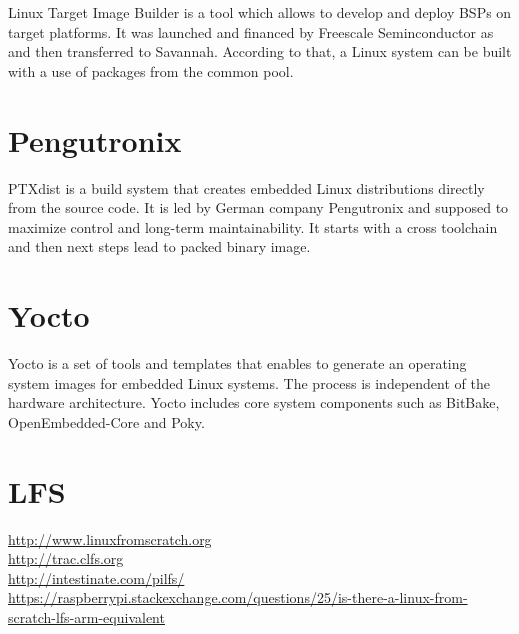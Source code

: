 \documentclass[printmode]{mgr}
\begin{document}

Linux Target Image Builder is a tool which allows to develop and deploy BSPs on target platforms. It was launched and financed by Freescale Seminconductor as  and then transferred to Savannah. According to that, a Linux system can be built with a use of packages from the common pool.

\section{Pengutronix}


PTXdist is a build system that creates embedded Linux distributions directly from the source code. It is led by German company Pengutronix and supposed to maximize control and long-term maintainability. It starts with a cross toolchain and then next steps lead to packed binary image.

\section{Yocto}

Yocto is a set of tools and templates that enables to generate an operating system images for embedded Linux systems. The process is independent of the hardware architecture. Yocto includes core system components such as BitBake, OpenEmbedded-Core and Poky. 

\section{LFS}

\url{http://www.linuxfromscratch.org}\\
\url{http://trac.clfs.org}\\
\url{http://intestinate.com/pilfs/}\\
\url{https://raspberrypi.stackexchange.com/questions/25/is-there-a-linux-from-scratch-lfs-arm-equivalent}
\end{document}
